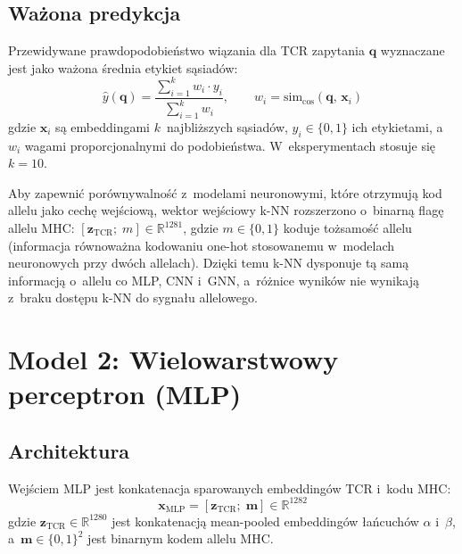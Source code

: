 \documentclass{SGGW-thesis}
\begin{document}
\subsection{Ważona predykcja}

Przewidywane prawdopodobieństwo wiązania dla TCR zapytania $\mathbf{q}$ wyznaczane jest jako
ważona średnia etykiet sąsiadów:
\begin{equation}
    \hat{y}(\mathbf{q}) = \frac{\displaystyle\sum_{i=1}^{k} w_i \cdot y_i}{\displaystyle\sum_{i=1}^{k} w_i}, \qquad w_i = \mathrm{sim}_{\cos}(\mathbf{q},\, \mathbf{x}_i)
    \label{eq:knn_pred}
\end{equation}
gdzie $\mathbf{x}_i$ są embeddingami $k$~najbliższych sąsiadów, $y_i \in \{0,1\}$ ich etykietami,
a~$w_i$ wagami proporcjonalnymi do podobieństwa. W~eksperymentach stosuje się $k = 10$.

Aby zapewnić porównywalność z~modelami neuronowymi, które otrzymują kod allelu jako cechę
wejściową, wektor wejściowy k-NN rozszerzono o~binarną flagę allelu MHC:
$\left[\mathbf{z}_{\mathrm{TCR}};\; m\right] \in \mathbb{R}^{1281}$, gdzie $m \in \{0,1\}$ koduje
tożsamość allelu (informacja równoważna kodowaniu one-hot stosowanemu w~modelach neuronowych
przy dwóch allelach). Dzięki temu k-NN dysponuje tą samą informacją o~allelu co MLP, CNN i~GNN,
a~różnice wyników nie wynikają z~braku dostępu k-NN do sygnału allelowego.

\section{Model 2: Wielowarstwowy perceptron (MLP)}

\subsection{Architektura}

Wejściem MLP jest konkatenacja sparowanych embeddingów TCR i~kodu MHC:
\begin{equation}
    \mathbf{x}_{\mathrm{MLP}} = \left[\mathbf{z}_{\mathrm{TCR}};\; \mathbf{m}\right] \in \mathbb{R}^{1282}
    \label{eq:mlp_input}
\end{equation}
gdzie $\mathbf{z}_{\mathrm{TCR}} \in \mathbb{R}^{1280}$ jest konkatenacją mean-pooled embeddingów
łańcuchów $\alpha$ i~$\beta$, a~$\mathbf{m} \in \{0,1\}^2$ jest binarnym kodem allelu MHC.
\end{document}
